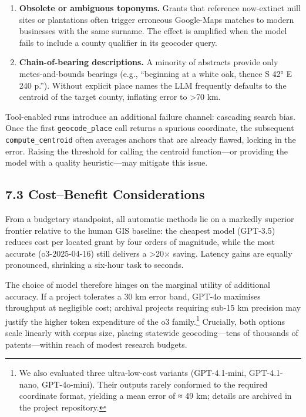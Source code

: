 \documentclass[
  11pt,
]{article}
\providecommand{\tightlist}{%
  \setlength{\itemsep}{0pt}\setlength{\parskip}{0pt}}
\begin{document}
\begin{enumerate}
\def\labelenumi{\arabic{enumi}.}
\tightlist
\item
  \textbf{Obsolete or ambiguous toponyms.} Grants that reference
  now-extinct mill sites or plantations often trigger erroneous
  Google-Maps matches to modern businesses with the same surname. The
  effect is amplified when the model fails to include a county qualifier
  in its geocoder query.
\item
  \textbf{Chain-of-bearing descriptions.} A minority of abstracts
  provide only metes-and-bounds bearings (e.g., ``beginning at a white
  oak, thence S 42° E 240 p.''). Without explicit place names the LLM
  frequently defaults to the centroid of the target county, inflating
  error to \textgreater70 km.
\end{enumerate}

Tool-enabled runs introduce an additional failure channel: cascading
search bias. Once the first \texttt{geocode\_place} call returns a
spurious coordinate, the subsequent \texttt{compute\_centroid} often
averages anchors that are already flawed, locking in the error. Raising
the threshold for calling the centroid function---or providing the model
with a quality heuristic---may mitigate this issue.

\subsection{7.3 Cost--Benefit
Considerations}\label{costbenefit-considerations}

From a budgetary standpoint, all automatic methods lie on a markedly
superior frontier relative to the human GIS baseline: the cheapest model
(GPT-3.5) reduces cost per located grant by four orders of magnitude,
while the most accurate (o3-2025-04-16) still delivers a \textgreater20×
saving. Latency gains are equally pronounced, shrinking a six-hour task
to seconds.

The choice of model therefore hinges on the marginal utility of
additional accuracy. If a project tolerates a 30 km error band, GPT-4o
maximises throughput at negligible cost; archival projects requiring
sub-15 km precision may justify the higher token expenditure of the o3
family.\footnote{We also evaluated three ultra-low-cost variants
  (GPT-4.1-mini, GPT-4.1-nano, GPT-4o-mini). Their outputs rarely
  conformed to the required coordinate format, yielding a mean error of
  ≈ 49 km; details are archived in the project repository.} Crucially,
both options scale linearly with corpus size, placing statewide
geocoding---tens of thousands of patents---within reach of modest
research budgets.
\end{document}
